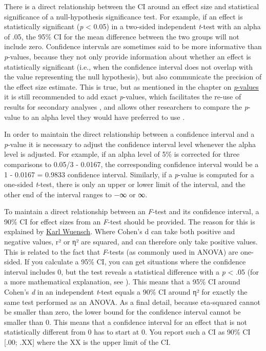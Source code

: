 \documentclass[
  oneside]{krantz}
\begin{document}
There is a direct relationship between the CI around an effect size and statistical significance of a null-hypothesis significance test. For example, if an effect is statistically significant (\emph{p} \textless{} 0.05) in a two-sided independent \emph{t}-test with an alpha of .05, the 95\% CI for the mean difference between the two groups will not include zero. Confidence intervals are sometimes said to be more informative than \emph{p}-values, because they not only provide information about whether an effect is statistically significant (i.e., when the confidence interval does not overlap with the value representing the null hypothesis), but also communicate the precision of the effect size estimate. This is true, but as mentioned in the chapter on \href{pvalue}{\emph{p}-values} it is still recommended to add exact \emph{p}-values, which facilitates the re-use of results for secondary analyses \citep{appelbaum_journal_2018}, and allows other researchers to compare the \emph{p}-value to an alpha level they would have preferred to use \citep{lehmann_testing_2005}.

In order to maintain the direct relationship between a confidence interval and a \emph{p}-value it is necessary to adjust the confidence interval level whenever the alpha level is adjusted. For example, if an alpha level of 5\% is corrected for three comparisons to 0.05/3 - 0.0167, the corresponding confidence interval would be a 1 - 0.0167 = 0.9833 confidence interval. Similarly, if a \emph{p}-value is computed for a one-sided \emph{t}-test, there is only an upper or lower limit of the interval, and the other end of the interval ranges to −∞ or ∞.

To maintain a direct relationship between an \emph{F}-test and its confidence interval, a 90\% CI for effect sizes from an \emph{F}-test should be provided. The reason for this is explained by \href{http://core.ecu.edu/psyc/wuenschk/docs30/CI-Eta2-Alpha.doc}{Karl Wuensch}. Where Cohen's d can take both positive and negative values, r² or η² are squared, and can therefore only take positive values. This is related to the fact that \emph{F}-tests (as commonly used in ANOVA) are one-sided. If you calculate a 95\% CI, you can get situations where the confidence interval includes 0, but the test reveals a statistical difference with a \emph{p} \textless{} .05 (for a more mathematical explanation, see \citet{steiger_beyond_2004}). This means that a 95\% CI around Cohen's \emph{d} in an independent \emph{t}-test equals a 90\% CI around η² for exactly the same test performed as an ANOVA. As a final detail, because eta-squared cannot be smaller than zero, the lower bound for the confidence interval cannot be smaller than 0. This means that a confidence interval for an effect that is not statistically different from 0 has to start at 0. You report such a CI as 90\% CI {[}.00; .XX{]} where the XX is the upper limit of the CI.
\end{document}
